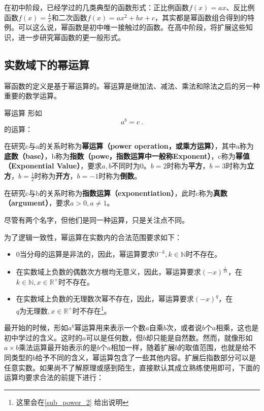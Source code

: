 


在初中阶段，已经学过的几类典型的函数形式：正比例函数$f(x) = ax$、反比例函数$\displaystyle f(x) = \frac{k}{x}$和二次函数$f(x) = ax^2+bx+c$，其实都是幂函数组合得到的特例。可以这么说，幂函数是初中唯一接触过的函数。在高中阶段，将扩展这些知识，进一步研究幂函数的更一般形式。

\subsection{实数域下的幂运算}

幂函数的定义是基于幂运算的。幂运算是继加法、减法、乘法和除法之后的另一种重要的数学运算。

\begin{definition}{幂运算}\label{def_power_1}
形如
\begin{equation}
a^b=c~.
\end{equation}
的运算：

在研究c与a的关系时称为\textbf{幂运算（power operation，或乘方运算）}，其中a称为\textbf{底数（base）}，b称为\textbf{指数（powe，指数运算中一般称Exponent）}，c称为\textbf{幂值（Exponential Value）}，要求$a,b$不同时为$0$。$b=2$时称为\textbf{平方}，$b=3$时称为\textbf{立方}，$\displaystyle b=\frac{1}{2}$时称为\textbf{开方}，$b=-1$时称为\textbf{倒数}。

在研究c与b的关系时称为\textbf{指数运算（exponentiation）}，此时c称为\textbf{真数（argument）}，要求$a>0,a\neq1$。

尽管有两个名字，但他们是同一种运算，只是关注点不同。
\end{definition}

为了逻辑一致性，幂运算在实数内的合法范围要求如下：
\begin{itemize}
\item $0$当分母的运算是非法的，因此，幂运算要求$0^{-k},k\in \mathbb{N}$时不存在。
\item 在实数域上负数的偶数次方根均无意义，因此，幂运算要求$\displaystyle(-x)^\frac{1}{2k}$，在$k\in \mathbb{N},x\in\mathbb{R}^+$时不存在。
\item 在实数域上负数的无理数次幂不存在，因此，幂运算要求$\displaystyle(-x)^q$，在$q\text{为无理数},x\in\mathbb{R}^+$时不存在\footnote{这里会在\autoref{sub_power_2} 给出说明}。
\end{itemize}

最开始的时候，形如$a^b$幂运算用来表示一个数$a$自乘$b$次，或者说$b$个$a$相乘，这也是初中学过的含义。这时的$a$可以是任何数，但$b$却只能是自然数。然而，就像形如$a\times b$乘法运算最开始表示的是$b$个$a$相加一样，随着扩展$b$的取值范围，也就是给不同类型的$b$给予不同的含义，幂运算包含了一些其他内容。扩展后指数部分可以是任意实数。如果尚不了解原理或感到陌生，直接默认其成立熟练使用即可，下面的运算均要求合法的前提下进行：

